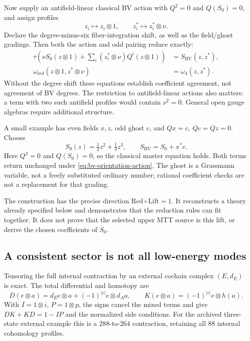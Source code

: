 \documentclass[11pt,a4paper]{article}
\begin{document}
Now supply an antifield-linear classical BV action with
\(Q^2=0\) and \(Q(S_0)=0\), and assign profiles
\[
 z_i\longmapsto z_i\otimes1,\qquad
 z_i^*\longmapsto z_i^*\otimes\nu .
\]
Declare the degree-minus-six fiber-integration shift, as well as the
field/ghost gradings. Then both the action and odd pairing reduce exactly:
\begin{align}
 \tau\!\left(\nu S_0(z\otimes1)
       +\sum_i(z_i^*\otimes\nu)Q^i(z\otimes1)\right)
   &=S_{\mathrm{BV}}(z,z^*), \label{eq:bv-orientation-action}\\
 \omega_{\mathrm{red}}(z\otimes1,z^*\otimes\nu)
   &=\omega_4(z,z^*). \label{eq:bv-orientation-pairing}
\end{align}
Without the degree shift these equations establish coefficient agreement,
not agreement of BV degrees. The restriction to antifield-linear actions
also matters: a term with two such antifield profiles would contain
\(\nu^2=0\). General open gauge algebras require additional structure.

A small example has even fields \(x,z\), odd ghost \(c\), and
\(Qx=c,\ Qc=Qz=0\). Choose
\[
 S_0(z)=\tfrac12z^2+\tfrac13z^3,\qquad
 S_{\mathrm{BV}}=S_0+x^*c .
\]
Here \(Q^2=0\) and \(Q(S_0)=0\), so the classical master equation holds.
Both terms return unchanged under \eqref{eq:bv-orientation-action}. The
ghost is a Grassmann variable, not a freely substituted ordinary number;
rational coefficient checks are not a replacement for that grading.

The construction has the precise direction
\(\mathrm{Red}\circ\mathrm{Lift}=1\). It reconstructs a theory already
specified below and demonstrates that the reduction rules can fit together.
It does not prove that the selected upper MTT source is this lift, or derive
the chosen coefficients of \(S_0\).

\subsection{A consistent sector is not all low-energy modes}
\label{sec:bv-mode-completeness}

Tensoring the full internal contraction by an external cochain complex
\((E,d_E)\) is exact. The total differential and homotopy are
\[
 D(e\otimes a)=d_Ee\otimes a+(-1)^{|e|}e\otimes d_Aa,\qquad
 K(e\otimes a)=(-1)^{|e|}e\otimes h(a).
\]
With \(I=1\otimes i\), \(P=1\otimes p\), the signs cancel the mixed
terms and give \(DK+KD=1-IP\) and the normalized side conditions. For
the archived three-state external example this is a \(288\)-to-\(264\)
contraction, retaining all \(88\) internal cohomology profiles.
\end{document}
